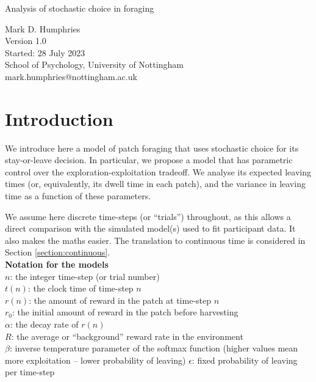 \documentclass[11pt,a4paper]{article}
\begin{document}
\noindent \Large{Analysis of stochastic choice in foraging} \\

\vspace{0.25cm}

\normalsize
\noindent Mark D. Humphries \\

\noindent Version 1.0 \\
\noindent Started: 28 July 2023 \\


 School of Psychology, University of Nottingham \\

 mark.humphries@nottingham.ac.uk \\

\begin{abstract}
Optimal models of patch foraging assume a deterministic choice rule. We analyse here a stochastic choice model of patch foraging, based on exploit-explore action selection models from reinforcement learning.
\end{abstract}

\section{Introduction}
We introduce here a model of patch foraging that uses stochastic choice for its stay-or-leave decision. In particular, we propose a model that has parametric control over the exploration-exploitation tradeoff. We analyse its expected leaving times (or, equivalently, its dwell time in each patch), and the variance in leaving time as a function of these parameters.

We assume here discrete time-steps (or ``trials'') throughout, as this allows a direct comparison with the simulated model(s) used to fit participant data. It also makes the maths easier. The translation to continuous time is considered in Section \ref{section:continuous}.  \\

\noindent \textbf{Notation for the models} \\
$n$: the integer time-step (or trial number) \\
$t(n)$: the clock time of time-step $n$ \\
$r(n)$: the amount of reward in the patch at time-step $n$ \\
$r_0$: the initial amount of reward in the patch before harvesting \\
$\alpha$: the decay rate of $r(n)$ \\
$R$: the average or ``background'' reward rate in the environment \\ 
$\beta$: inverse temperature parameter of the softmax function (higher values mean more exploitation -- lower probability of leaving)
$\epsilon$: fixed probability of leaving per time-step
\end{document}
